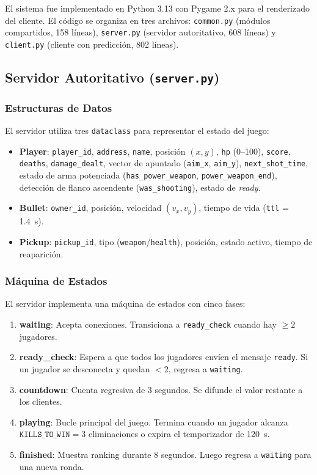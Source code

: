 \documentclass[conference]{IEEEtran}
\begin{document}
El sistema fue implementado en Python 3.13 con Pygame 2.x para el renderizado del cliente. El c\'odigo se organiza en tres archivos: \texttt{common.py} (m\'odulos compartidos, 158 l\'ineas), \texttt{server.py} (servidor autoritativo, 608 l\'ineas) y \texttt{client.py} (cliente con predicci\'on, 802 l\'ineas).

\subsection{Servidor Autoritativo (\texttt{server.py})}

\subsubsection{Estructuras de Datos}

El servidor utiliza tres \texttt{dataclass} para representar el estado del juego:

\begin{itemize}
    \item \textbf{Player}: \texttt{player\_id}, \texttt{address}, \texttt{name}, posici\'on $(x, y)$, \texttt{hp} (0--100), \texttt{score}, \texttt{deaths}, \texttt{damage\_dealt}, vector de apuntado (\texttt{aim\_x}, \texttt{aim\_y}), \texttt{next\_shot\_time}, estado de arma potenciada (\texttt{has\_power\_weapon}, \texttt{power\_weapon\_end}), detecci\'on de flanco ascendente (\texttt{was\_shooting}), estado de \textit{ready}.
    \item \textbf{Bullet}: \texttt{owner\_id}, posici\'on, velocidad $(v_x, v_y)$, tiempo de vida (\texttt{ttl} = 1.4~s).
    \item \textbf{Pickup}: \texttt{pickup\_id}, tipo (\texttt{weapon}/\texttt{health}), posici\'on, estado activo, tiempo de reaparici\'on.
\end{itemize}

\subsubsection{M\'aquina de Estados}

El servidor implementa una m\'aquina de estados con cinco fases:

\begin{enumerate}
    \item \textbf{waiting}: Acepta conexiones. Transiciona a \texttt{ready\_check} cuando hay $\geq 2$ jugadores.
    \item \textbf{ready\_check}: Espera a que todos los jugadores env\'ien el mensaje \texttt{ready}. Si un jugador se desconecta y quedan $< 2$, regresa a \texttt{waiting}.
    \item \textbf{countdown}: Cuenta regresiva de 3 segundos. Se difunde el valor restante a los clientes.
    \item \textbf{playing}: Bucle principal del juego. Termina cuando un jugador alcanza $\texttt{KILLS\_TO\_WIN} = 3$ eliminaciones o expira el temporizador de 120~s.
    \item \textbf{finished}: Muestra ranking durante 8 segundos. Luego regresa a \texttt{waiting} para una nueva ronda.
\end{enumerate}
\end{document}
